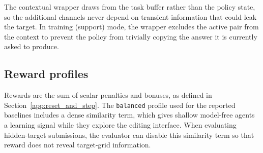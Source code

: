 \begin{table}[htbp]
\centering
\caption{Observation wrappers. Channel counts are additive to the base working grid.}
\label{tab:observation_wrappers}
\scriptsize
{}
\end{table}

The contextual wrapper draws from the task buffer rather than the policy state, so the additional channels never depend on transient information that could leak the target. In training (support) mode, the wrapper excludes the active pair from the context to prevent the policy from trivially copying the answer it is currently asked to produce.

\subsection{Reward profiles}
\label{app:reward_config}

Rewards are the sum of scalar penalties and bonuses, as defined in Section~\ref{app:reset_and_step}. The \texttt{balanced} profile used for the reported baselines includes a dense similarity term, which gives shallow model-free agents a learning signal while they explore the editing interface. When evaluating hidden-target submissions, the evaluator can disable this similarity term so that reward does not reveal target-grid information.

\begin{table}[htbp]
\centering
\caption{Scalar reward components in JaxARC profiles. Similarity reward is multiplied by an indicator that is zero in evaluation mode.}
\label{tab:reward_profiles}
\scriptsize
{}
\end{table}

